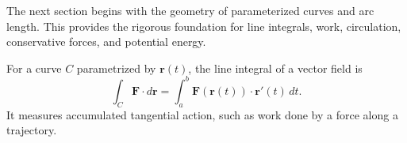 \begin{lookingaheadbox}
The next section begins with the geometry of parameterized curves and arc
length. This provides the rigorous foundation for line integrals, work,
circulation, conservative forces, and potential energy.
\end{lookingaheadbox}

For a curve $C$ parametrized by $\mathbf r(t)$, the line integral of a vector field is
\[
\int_C \mathbf F\cdot d\mathbf r
=\int_a^b \mathbf F(\mathbf r(t))\cdot \mathbf r'(t)\,dt.
\]
It measures accumulated tangential action, such as work done by a force along a trajectory.
